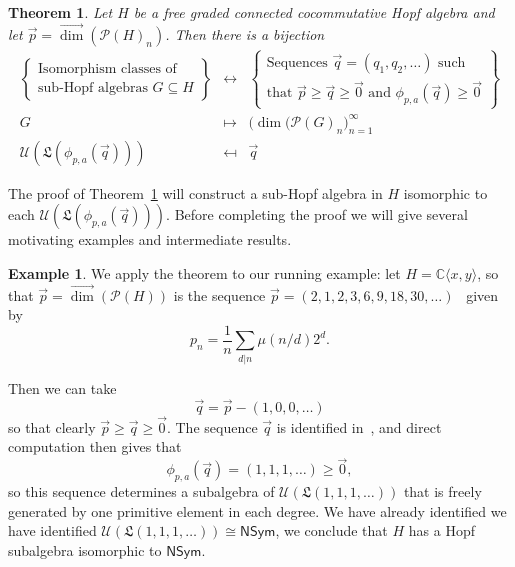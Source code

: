 \documentclass[11pt]{amsart}
\newtheorem{thm}{Theorem}
\theoremstyle{definition}
\newtheorem{example}[theorem]{Example}
\numberwithin{equation}{section}
\def\CC{{\mathbb C}}
\newcommand{\lucas}[1]{\todo[size=\tiny,color=red!50]{#1 \\ \hfill --- Lucas}}
\begin{document}
\begin{thm}
\label{thm:subclassification2}
Let $H$ be a free graded connected cocommutative Hopf algebra and let $\vec{p} = \vec{\dim}(\mathcal{P}(H)_{n})$.  Then there is a bijection
\[
\begin{array}{rcl}
\left\{\begin{array}{c}
\text{Isomorphism classes of} \\
\text{sub-Hopf algebras $G \subseteq H$}
\end{array}\right\}
& \leftrightarrow & 
\left\{\begin{array}{c}
\text{Sequences $\vec{q} = (q_{1}, q_{2}, \ldots)$ such } \\
\text{that $\vec{p} \ge \vec{q} \ge \vec{0}$ and $\phi_{p, a}(\vec{q}) \ge \vec{0}$} 
\end{array}\right\} \\[2em]
G & \mapsto & \big(\dim(\mathcal{P}(G)_{n} \big)_{n = 1}^{\infty} \\
\mathcal{U}(\mathfrak{L}(\phi_{p, a}(\vec{q}))) & \mapsfrom & \vec{q}
\end{array}
\]
\end{thm}

The proof of Theorem~\ref{thm:subclassification2} will construct a sub-Hopf algebra in $H$ isomorphic to each $\mathcal{U}(\mathfrak{L}(\phi_{p, a}(\vec{q})))$.  
Before completing the proof we will give several motivating examples and intermediate results.

\begin{example}
\label{ex:NSymInCxy}
We apply the theorem to our running example: let $H = \CC\langle x, y \rangle$,
so that $\vec{p} = \vec{\dim}(\mathcal{P}(H))$ is the sequence
$\vec{p} = (2, 1, 2, 3, 6, 9, 18, 30,\ldots)$~\cite[A001037]{OEIS} given by 
\[
p_{n} = \frac{1}{n} \sum_{d | n} \mu(n/d) 2^{d}.
\]

Then we can take 
\[
\vec{q} = \vec{p} - (1, 0, 0, \ldots)
\]
so that clearly $\vec{p} \ge \vec{q} \ge \vec{0}$.  
The sequence $\vec{q}$ is identified in~\cite[A059966]{OEIS}, and direct computation then gives that
\[
\phi_{p, a}(\vec{q}) = (1, 1, 1, \ldots) \ge \vec{0},
\]
so this sequence determines a subalgebra of $\mathcal{U}(\mathfrak{L}(1, 1, 1, \ldots))$
that is freely generated by one primitive element in each degree. 
We have already\lucas{pretend that we have} identified we have identified $\mathcal{U}(\mathfrak{L}(1, 1, 1, \ldots)) \cong \mathsf{NSym}$, we conclude that $H$ has a Hopf subalgebra isomorphic to $\mathsf{NSym}$.
\end{example}
\end{document}
